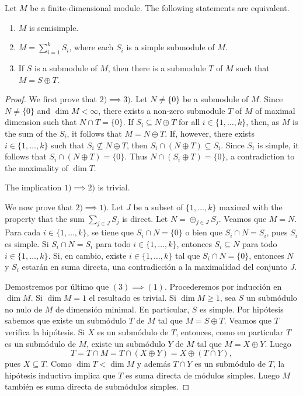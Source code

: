 \begin{proposition}
\label{pro:semisimple}
	Let $M$ be a finite-dimensional module. The following statements are equivalent.
	\begin{enumerate}
		\item $M$ is semisimple.
		\item $M=\sum_{i=1}^k S_i$, where each $S_i$ is a simple submodule of $M$. 
		\item If $S$ is a submodule of $M$, then there is a submodule $T$ of $M$ such that $M=S\oplus T$.    
	\end{enumerate}
\end{proposition}

\begin{proof}
	We first prove that $2)\implies3)$.
	Let $N\ne\{0\}$ be a submodule of $M$. Since $N\ne\{0\}$ and $\dim M<\infty$, there exists a non-zero submodule 
	$T$ of $M$ of maximal dimension such that 
	$N\cap T=\{0\}$. If $S_i\subseteq N\oplus T$ for all $i\in\{1,\dots,k\}$, then, as $M$ is the sum of the $S_i$, it follows that
	$M=N\oplus T$. 
	If, however, there exists $i\in\{1,\dots,k\}$ such that $S_i\not\subseteq N\oplus T$, then $S_i\cap (N\oplus T)\subseteq S_i$. 
	Since $S_i$ is simple,
	it follows that $S_i\cap (N\oplus T)=\{0\}$. Thus $N\cap (S_i\oplus T)=\{0\}$, a contradiction to the maximality of
	$\dim T$.  
	
	The implication  $1)\implies2)$ is trivial. 
	
	We now prove that $2)\implies1)$. Let $J$ be a subset of $\{1,\dots,k\}$ maximal with the property that 
	the sum $\sum_{j\in J}S_j$ is direct. Let $N=\oplus_{j\in J}S_j$. Veamos que $M=N$. 
	Para cada $i\in\{1,\dots,k\}$, se tiene que $S_i\cap N=\{0\}$ o bien que $S_i\cap N=S_i$, pues
	$S_i$ es simple. Si $S_i\cap N=S_i$ para todo $i\in\{1,\dots,k\}$, entonces $S_i\subseteq N$ para todo $i\in\{1,\dots,k\}$.  
	Si, en cambio, existe $i\in\{1,\dots,k\}$ tal que $S_i\cap N=\{0\}$, entonces $N$ y $S_i$ estarán en suma directa, 
	una contradicción a la maximalidad del conjunto $J$.
	
	Demostremos por último que $(3)\implies(1)$. 
	Procederemos por inducción en $\dim M$. Si $\dim M=1$ el resultado es trivial. Si $\dim M\geq1$, 
	sea $S$ un submódulo no nulo de $M$ de dimensión minimal. En particular, $S$ es simple. 
	Por hipótesis sabemos que existe un submódulo $T$ de $M$ tal que $M=S\oplus T$. Veamos que $T$ verifica la hipótesis. 
	Si $X$ es un submódulo de $T$, entonces, como en particular $T$ es un submódulo de $M$, existe un submódulo $Y$ de $M$ tal que
	$M=X\oplus Y$. Luego 
	\[
	T=T\cap M=T\cap (X\oplus Y)=X\oplus (T\cap Y),
	\]
	pues $X\subseteq T$. 
	Como $\dim T<\dim M$ y además $T\cap Y$ es un submódulo de $T$, la hipótesis inductiva 
	implica que $T$ es suma directa de módulos simples. Luego $M$ también es suma
	directa de submódulos simples. 
\end{proof}

